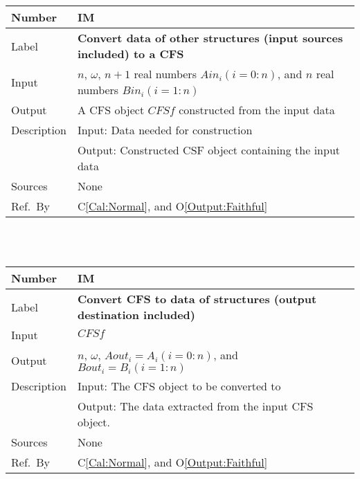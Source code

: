 \documentclass[12pt]{article}
\newcommand{\colAwidth}{0.13\textwidth}
\newcommand{\colBwidth}{0.82\textwidth}
\newcounter{instnum} %
\newcommand{\calref}[1]{C\ref{#1}}
\newcommand{\oref}[1]{O\ref{#1}}
\begin{document}
\noindent
\begin{minipage}{\textwidth}
	\renewcommand*{\arraystretch}{1.5}
	\begin{tabular}{| p{\colAwidth} | p{\colBwidth}|}
		\hline
		\rowcolor[gray]{0.9}
		Number& IM{instnum}\theinstnum 
		\label{IM:ConvertTo}\\
		\hline
		Label& \bf Convert data of other structures 
		(input sources included) to a CFS \\
		\hline
		Input& $n$, $\omega$, $n+1$ real numbers $\mathit{Ain}_{i} 
		(i=0:n)$, and $n$ real numbers $\mathit{Bin}_{i} (i=1:n)$\\
		\hline
		Output& A CFS object $\mathit{CFSf}$ constructed from 
		the input data\\
		\hline
		Description&Input: Data needed for construction\\
		&Output: Constructed CSF object containing the input data\\
		\hline
		Sources&None		\\
		\hline
		Ref.\ By &   \calref{Cal:Normal}, 
		and \oref{Output:Faithful}\\
		\hline
	\end{tabular}
\end{minipage}\\
~\newline

\noindent
\begin{minipage}{\textwidth}
	\renewcommand*{\arraystretch}{1.5}
	\begin{tabular}{| p{\colAwidth} | p{\colBwidth}|}
		\hline
		\rowcolor[gray]{0.9}
		Number& IM{instnum}\theinstnum 
		\label{IM:ConvertFrom}\\
		\hline
		Label& \bf Convert CFS to data of structures 
		(output destination included) \\
		\hline
		Input& $\mathit{CFSf}$\\
		\hline
		Output& $n$, $\omega$, $\mathit{Aout}_{i}=A_i (i=0:n)$, 
		and $\mathit{Bout}_{i}=B_i (i=1:n)$\\
		\hline
		Description&Input: The CFS object to be converted to\\
		&Output: The data extracted from the input CFS object.\\
		\hline
		Sources&None\\
		\hline
		Ref.\ By &    \calref{Cal:Normal}, 
		and \oref{Output:Faithful}\\
		\hline
	\end{tabular}
\end{minipage}\\
~\newline
\end{document}
